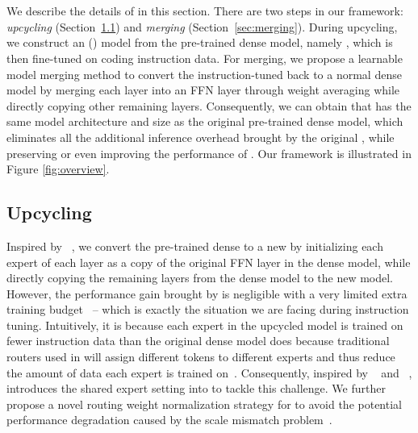 \section{\ours}

We describe the details of \ours in this section. There are two steps in our framework: \textit{upcycling} (Section~\ref{sec:upcycling}) and \textit{merging} (Section~\ref{sec:merging}). During upcycling, we construct an \moefull (\moe) model from the pre-trained dense model, namely \textbf{\oursmoe}, which is then fine-tuned on coding instruction data. For merging, we propose a learnable model merging method to convert the instruction-tuned \oursmoe back to a normal dense model by merging each \moe layer into an FFN layer through weight averaging while directly copying other remaining layers. Consequently, we can obtain \textbf{\oursmerge} that has the same model architecture and size as the original pre-trained dense model, which eliminates all the additional inference overhead brought by the original \sparseupcycle, while preserving or even improving the performance of \oursmoe. Our framework is illustrated in Figure \ref{fig:overview}.

\subsection{Upcycling}\label{sec:upcycling}
Inspired by \sparseupcycle~\cite{komatsuzaki2023sparse}, we convert the pre-trained dense \llm to a new \moe by initializing each expert of each \moe layer as a copy of the original FFN layer in the dense model, while directly copying the remaining layers from the dense model to the new \moe model. However, the performance gain brought by \sparseupcycle is negligible with a very limited extra training budget~\cite{komatsuzaki2023sparse} -- which is exactly the situation we are facing during instruction tuning. Intuitively, it is because each expert in the upcycled \moe model is trained on fewer instruction data than the original dense model does because traditional routers used in \sparseupcycle will assign different tokens to different experts and thus reduce the amount of data each expert is trained on~\cite{gou2024mixture}. Consequently, inspired by \deepseekmoe~\cite{dai2024deepseekmoe} and \mocle~\cite{gou2024mixture}, \ours introduces the shared expert setting into \sparseupcycle to tackle this challenge. We further propose a novel routing weight normalization strategy for \ours to avoid the potential performance degradation caused by the scale mismatch problem~\cite{wu2022residual}.

